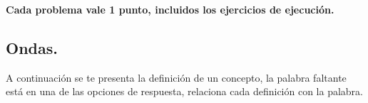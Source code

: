 \documentclass[12pt, letter]{exam}
\begin{document}
% 

\begin{center}
\textbf{Cada problema vale 1 punto, incluidos los ejercicios de ejecución.}
\end{center}

\begin{questions}

    \section{Ondas.}
    A continuación se te presenta la definición de un concepto, la palabra faltante está en una de las opciones de respuesta, relaciona cada definición con la palabra.

    \question 

\end{questions}
\end{document}
